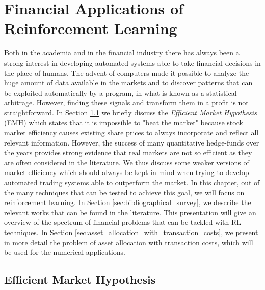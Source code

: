 \chapter{Financial Applications of Reinforcement Learning}
\label{ch:financial_applications_of_reinforcement_learning}

Both in the academia and in the financial industry there has always been a strong interest in developing automated systems able to take financial decisions in the place of humans. The advent of computers made it possible to analyze the huge amount of data available in the markets and to discover patterns that can be exploited automatically by a program, in what is known as a statistical arbitrage. However, finding these signals and transform them in a profit is not straightforward. In Section  \ref{sec:efficient_market_hypothesis} we briefly discuss the \emph{Efficient Market Hypothesis} (EMH) which states that it is impossible to "beat the market" because stock market efficiency causes existing share prices to always incorporate and reflect all relevant information. However, the success of many quantitative hedge-funds over the years provides strong evidence that real markets are not so efficient as they are often considered in the literature. We thus discuss some weaker versions of market efficiency which should always be kept in mind when trying to develop automated trading systems able to outperform the market. In this chapter, out of the many techniques that can be tested to achieve this goal, we will focus on reinforcement learning. In Section \ref{sec:bibliographical_survey}, we describe the relevant works that can be found in the literature. This presentation will give an overview of the spectrum of financial problems that can be tackled with RL techniques. In Section \ref{sec:asset_allocation_with_transaction_costs}, we present in more detail the problem of asset allocation with transaction costs, which will be used for the numerical applications.

\section{Efficient Market Hypothesis}  
\label{sec:efficient_market_hypothesis}

